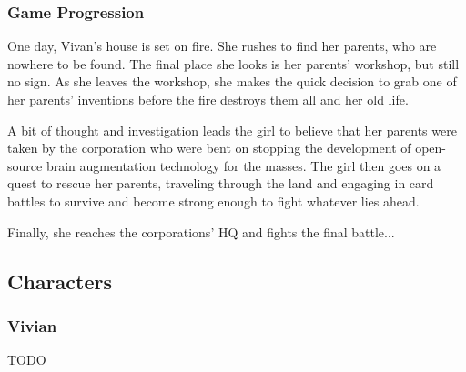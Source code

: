 \documentclass[12pt,titlepage]{article}
\begin{document}
\subsubsection{Game Progression}

One day, Vivan's house is set on fire. She rushes to find her parents, who are
nowhere to be found. The final place she looks is her parents' workshop, but
still no sign. As she leaves the workshop, she makes the quick decision to grab
one of her parents' inventions before the fire destroys them all and her old
life.

A bit of thought and investigation leads the girl to believe that her parents
were taken by the corporation who were bent on stopping the development of
open-source brain augmentation technology for the masses. The girl then goes on
a quest to rescue her parents, traveling through the land and engaging in card
battles to survive and become strong enough to fight whatever lies ahead.

Finally, she reaches the corporations' HQ and fights the final battle...






\subsection{Characters}

\subsubsection{Vivian}
TODO
\end{document}
